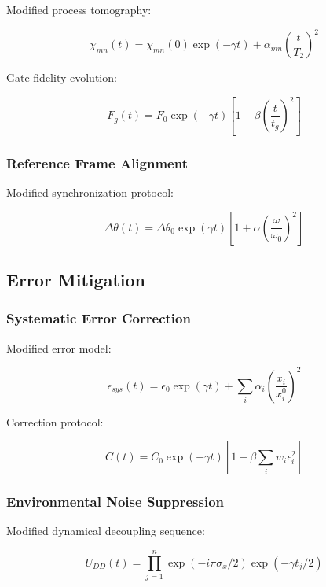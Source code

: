 \documentclass[12pt]{article}
\theoremstyle{plain}
\theoremstyle{definition}
\theoremstyle{remark}
\begin{document}
Modified process tomography:

\begin{equation}
\chi_{mn}(t) = \chi_{mn}(0)\exp(-\gamma t) + \alpha_{mn}\left(\frac{t}{T_2}\right)^2
\end{equation}

Gate fidelity evolution:

\begin{equation}
F_g(t) = F_0\exp(-\gamma t)\left[1 - \beta\left(\frac{t}{t_g}\right)^2\right]
\end{equation}

\subsubsection{Reference Frame Alignment}

Modified synchronization protocol:

\begin{equation}
\Delta\theta(t) = \Delta\theta_0\exp(\gamma t)\left[1 + \alpha\left(\frac{\omega}{\omega_0}\right)^2\right]
\end{equation}

\subsection{Error Mitigation}

\subsubsection{Systematic Error Correction}

Modified error model:

\begin{equation}
\epsilon_{sys}(t) = \epsilon_0\exp(\gamma t) + \sum_i \alpha_i\left(\frac{x_i}{x_i^0}\right)^2
\end{equation}

Correction protocol:

\begin{equation}
C(t) = C_0\exp(-\gamma t)\left[1 - \beta\sum_i w_i\epsilon_i^2\right]
\end{equation}

\subsubsection{Environmental Noise Suppression}

Modified dynamical decoupling sequence:

\begin{equation}
U_{DD}(t) = \prod_{j=1}^n \exp(-i\pi\sigma_x/2)\exp(-\gamma t_j/2)
\end{equation}
\end{document}

